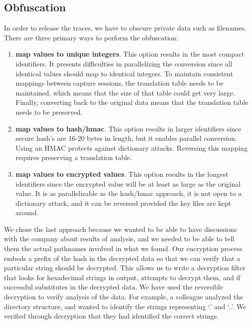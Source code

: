 
\subsection{Obfuscation}

In order to release the traces, we have to obscure private data such
as filenames.  There are three primary ways to perform the obfuscation: 

\begin{enumerate}

\item {\bf map values to unique integers}.  This option results in the
most compact identifiers.  It presents difficulties in parallelizing
the conversion since all identical values should map to
identical integers.  To maintain consistent mappings between capture
sessions, the translation table needs to be maintained, which means
that the size of that table could get very large.  Finally, converting
back to the original data means that the translation table needs to be
preserved.

\item {\bf map values to hash/hmac}.  This option results in larger
identifiers since secure hash's are 16-20 bytes in length, but it
enables parallel conversion.  Using an HMAC protects against
dictionary attacks.  Reversing this mapping requires preserving a
translation table.


\item {\bf map values to encrypted values}.  This option results in
the longest identifiers since the encrypted value will be at least as
large as the original value.  It is as parallelizable as the hash/hmac
approach, it is not open to a dictionary attack, and it can be
reversed provided the key files are kept around.

\end{enumerate}

We chose the last approach because we wanted to be able to have
discussions with the company about results of analysis, and we needed
to be able to tell them the actual pathnames involved in what we
found.  Our encryption process embeds a prefix of the hash in the
decrypted data so that we can verify that a particular string should
be decrypted.  This allows us to write a decryption filter that looks
for hexadecimal strings in output, attempts to decrypt them, and if
successful substitutes in the decrypted data.  We have used the
reversible decryption to verify analysis of the data.  For example, a
colleague analyzed the directory structure, and wanted to identify the
strings representing `.' and `..'.  We verified through decryption
that they had identified the correct strings.

